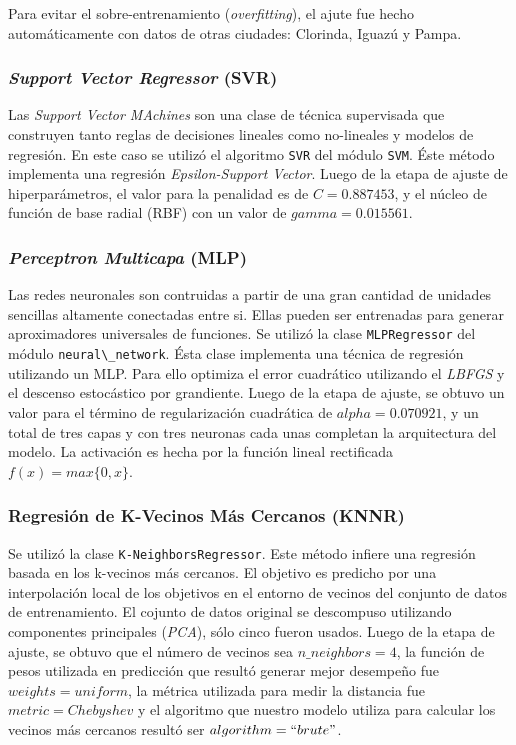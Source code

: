     \par Para evitar el sobre-entrenamiento (\textit{overfitting}), el ajute
      fue hecho automáticamente con datos de otras ciudades: Clorinda, Iguazú
      y Pampa.


    \subsubsection{\textit{Support Vector Regressor} (SVR)}
      \par Las \textit{Support Vector MAchines} son una clase de técnica supervisada
        que construyen tanto reglas de decisiones lineales como no-lineales
        y modelos de regresión. En este caso se utilizó el algoritmo \verb|SVR|
        del módulo \verb|SVM|. Éste método implementa una regresión
        \textit{Epsilon-Support Vector}. Luego de la etapa de ajuste de
        hiperparámetros, el valor para la penalidad es de $C = 0.887453$, y
        el núcleo de función de base radial (RBF) con un valor de
        $gamma = 0.015561$.


    \subsubsection{\textit{Perceptron Multicapa} (MLP)}
      \par Las redes neuronales son contruidas a partir de una gran cantidad
        de unidades sencillas altamente conectadas entre si. Ellas pueden
        ser entrenadas para generar aproximadores universales de funciones.
        Se utilizó la clase \verb|MLPRegressor| del módulo \verb|neural\_network|.
        Ésta clase implementa una técnica de regresión utilizando un MLP. Para
        ello optimiza el error cuadrático utilizando el \textit{LBFGS} y
        el descenso estocástico por grandiente.
        Luego de la etapa de ajuste, se obtuvo un valor para el término
        de regularización cuadrática de $alpha = 0.070921$, y un total de
        tres capas y con tres neuronas cada unas completan la arquitectura
        del modelo. La activación es hecha por la función lineal
        rectificada $f(x) = max\{0, x\}$.


    \subsubsection{Regresión de K-Vecinos Más Cercanos (KNNR)}
      \par Se utilizó la clase \verb|K-NeighborsRegressor|. Este método
        infiere una regresión basada en los k-vecinos más cercanos. El
        objetivo es predicho por una interpolación local de los objetivos
        en el entorno de vecinos del conjunto de datos de entrenamiento.
        El cojunto de datos original se descompuso utilizando componentes
        principales (\textit{PCA}), sólo cinco fueron usados. Luego de la etapa
        de ajuste, se obtuvo que el número de vecinos sea $n\_neighbors = 4$,
        la función de pesos utilizada en predicción que resultó generar mejor
        desempeño fue $weights = uniform$, la métrica utilizada para medir la
        distancia fue $metric = Chebyshev$ y el algoritmo que nuestro modelo
        utiliza para calcular los vecinos más cercanos resultó ser
        $algorithm = ``brute"$.


